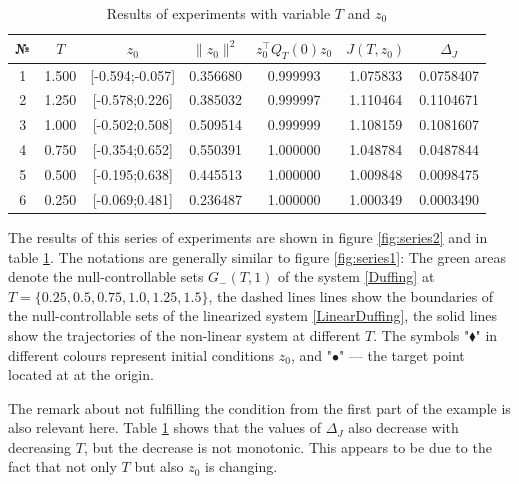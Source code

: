 \documentclass[../main.tex]{subfiles}
\begin{document}
\begin{table}
\caption{Results of experiments with variable $T$ and $z_0$}
\label{ExampleTable2}
\begin{center}
\begin{tabular}{c|c|c|c|c|c|c}
     № &    $T$  & $z_0$            & $\|z_0\|^2$&$z_0^{\top} Q_T(0) z_0$ &$J(T,z_0)$&$\Delta_J$ \\ \hline 
     1 &   1.500 & [-0.594;-0.057]  & 0.356680   & 0.999993    & 1.075833 & 0.0758407 \\ \hline
     2 &   1.250 & [-0.578;0.226]   & 0.385032   & 0.999997    & 1.110464 & 0.1104671 \\ \hline
     3 &   1.000 & [-0.502;0.508]   & 0.509514   & 0.999999    & 1.108159 & 0.1081607 \\ \hline
     4 &   0.750 & [-0.354;0.652]   & 0.550391   & 1.000000    & 1.048784 & 0.0487844 \\ \hline
     5 &   0.500 & [-0.195;0.638]   & 0.445513   & 1.000000    & 1.009848 & 0.0098475 \\ \hline
     6 &   0.250 & [-0.069;0.481]   & 0.236487   & 1.000000    & 1.000349 & 0.0003490 \\ \hline
\end{tabular}
\end{center}
\end{table} 

The results of this series of experiments 
are shown in figure \ref{fig:series2} and in table 
\ref{ExampleTable2}. The notations are generally similar to figure \ref{fig:series1}: 
The green areas denote the null-controllable sets $G_{-}(T,1)$ of the system 
\eqref{Duffing} at $T = \{0.25, 0.5, 0.75, 1.0, 1.25, 1.5\}$, the dashed lines 
lines show the boundaries of the null-controllable sets of the linearized system 
\eqref{LinearDuffing}, the solid lines show the trajectories of the non-linear system 
at different $T$. The symbols "$\blacklozenge$" in different colours represent 
initial conditions $z_0$, and "$\bullet$" --- the target point located at 
at the origin. 

The remark about not fulfilling the condition from the first part of the example is also relevant here. Table \ref{ExampleTable2} shows that the values of $\Delta_J$ also decrease with decreasing $T$, but the decrease is not monotonic. This appears to be due to the fact that not only $T$ but also $z_0$ is changing. 
\end{document}
